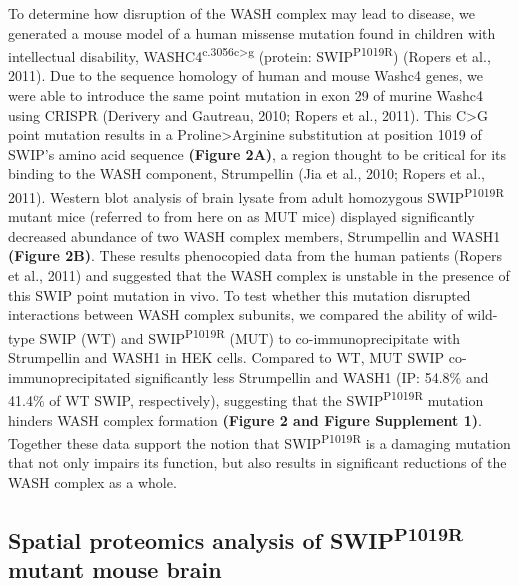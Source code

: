 To determine how disruption of the WASH complex may lead to
disease, we generated a mouse model of a human missense mutation found in
children with intellectual disability, WASHC4\textsuperscript{c.3056c>g} 
(protein: SWIP\textsuperscript{P1019R}) (Ropers et al., 2011). 
Due to the sequence homology of human and mouse Washc4
genes, we were able to introduce the same point mutation in exon 29 of murine
Washc4 using CRISPR (Derivery and Gautreau, 2010; Ropers et al., 2011). This C>G
point mutation results in a Proline>Arginine substitution at position 1019 of
SWIP’s amino acid sequence \textbf{(Figure 2A)}, a region thought to be critical for its
binding to the WASH component, Strumpellin (Jia et al., 2010; Ropers et al.,
2011). Western blot analysis of brain lysate from adult homozygous SWIP\textsuperscript{P1019R}
mutant mice (referred to from here on as MUT mice) displayed significantly
decreased abundance of two WASH complex members, Strumpellin and WASH1 
\textbf{(Figure 2B)}. These results phenocopied data from the human patients (Ropers et al.,
2011) and suggested that the WASH complex is unstable in the presence of this
SWIP point mutation in vivo. To test whether this mutation disrupted
interactions between WASH complex subunits, we compared the ability of wild-type
SWIP (WT) and SWIP\textsuperscript{P1019R} (MUT) to co-immunoprecipitate with Strumpellin and
WASH1 in HEK cells. Compared to WT, MUT SWIP co-immunoprecipitated significantly
less Strumpellin and WASH1 (IP: 54.8\% and 41.4\% of WT SWIP, respectively),
suggesting that the SWIP\textsuperscript{P1019R} mutation hinders WASH complex formation 
\textbf{(Figure 2 and Figure Supplement 1)}. Together these data support the notion that 
SWIP\textsuperscript{P1019R} is a damaging mutation that not only impairs its function, 
but also results in significant reductions of the WASH complex as a whole.

\subsection{Spatial proteomics analysis of SWIP\textsuperscript{P1019R} mutant mouse brain}

